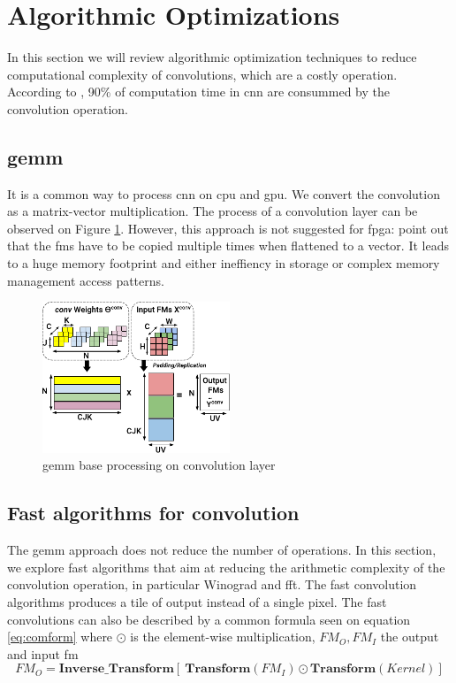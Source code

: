 \section{Algorithmic Optimizations} \label{sec:algopti}
In this section we will review algorithmic optimization techniques to reduce computational complexity of convolutions, which are a costly operation. According to \cite{shawahna_fpga-based_2019}, 90\% of computation time in \acrshort{cnn} are consummed by the convolution operation.
%
%
\subsection{\acrfull{gemm}}
%
%
It is a common way to process \acrshort{cnn} on \acrshort{cpu} and \acrshort{gpu}. We convert the convolution as a matrix-vector multiplication.  The process of a convolution layer can be observed on Figure \ref{fig:gemm}.
However, this approach is not suggested for \acrshort{fpga}: \cite{sze_efficient_2017, zhu_efficient_2020} point out that the \acrshort{fm}s have to be copied multiple times when flattened to a vector. It leads to a huge memory footprint and either ineffiency in storage or complex memory management access patterns.
\begin{figure}
    \centering
    \includegraphics[width=0.5\textwidth]{Images/gemm.pdf}
    \caption{\acrshort{gemm} base processing on convolution layer \cite{abdelouahab_accelerating_2018}}
    \label{fig:gemm}
\end{figure}
%
%
\subsection{Fast algorithms for convolution}
The \acrshort{gemm} approach does not reduce the number of operations. In this section, we explore fast algorithms that aim at reducing the arithmetic complexity of the convolution operation, in particular Winograd and \acrfull{fft}. The fast convolution algorithms produces a tile of output instead of a single pixel. The fast convolutions can also be described by a common formula seen on equation \ref{eq:comform} where $\odot$ is the element-wise multiplication, $FM_O, FM_I$ the output and input \acrshort{fm}
\begin{equation}
FM_O = \boldsymbol{Inverse\_Transform} [ \ \boldsymbol{Transform}(FM_I) \odot \boldsymbol{Transform}(Kernel) ]
\label{eq:comform}
\end{equation}
%
